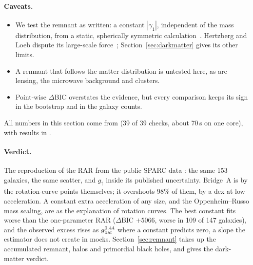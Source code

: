 \paragraph{Caveats.}
\begin{itemize}[nosep]
\item We test the remnant as written: a constant $|\gamma_1|$, independent of the mass distribution, from a static, spherically symmetric
calculation~\cite{oppenheimrusso}. Hertzberg and Loeb dispute its large-scale force~\cite{hertzberg2024}; Section~\ref{sec:darkmatter}
gives its other limits.
\item A remnant that follows the matter distribution is untested here, as are lensing, the microwave background and clusters.
\item Point-wise $\Delta$BIC overstates the evidence, but every comparison keeps its sign in the bootstrap and in the galaxy counts.
\end{itemize}

All numbers in this section come from  (39 of 39 checks, about 70\,s on one core), with results in
.

\paragraph{Verdict.} The reproduction of the RAR from the public SPARC data : the same 153 galaxies, the same scatter, and
$g_\dagger$ inside its published uncertainty. Bridge~A is  by the rotation-curve points themselves; it overshoots 98\% of them,
by a dex at low acceleration. A constant extra acceleration of any size, and the Oppenheim--Russo mass scaling, are  as the
explanation of rotation curves. The best constant fits worse than the one-parameter RAR ($\Delta$BIC $+5066$, worse in 109 of 147
galaxies), and the observed excess rises as $g_{\rm bar}^{0.44}$ where a constant predicts zero, a slope the estimator does not create in
mocks. Section~\ref{sec:remnant} takes up the accumulated remnant, halos and primordial black holes, and gives the dark-matter verdict.
